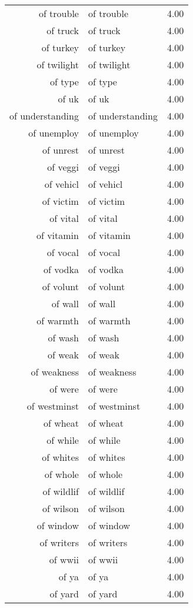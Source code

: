 \begin{table}[ht]
\begin{tabular}{rlr}
  of trouble & of trouble & 4.00 \\ 
  of truck & of truck & 4.00 \\ 
  of turkey & of turkey & 4.00 \\ 
  of twilight & of twilight & 4.00 \\ 
  of type & of type & 4.00 \\ 
  of uk & of uk & 4.00 \\ 
  of understanding & of understanding & 4.00 \\ 
  of unemploy & of unemploy & 4.00 \\ 
  of unrest & of unrest & 4.00 \\ 
  of veggi & of veggi & 4.00 \\ 
  of vehicl & of vehicl & 4.00 \\ 
  of victim & of victim & 4.00 \\ 
  of vital & of vital & 4.00 \\ 
  of vitamin & of vitamin & 4.00 \\ 
  of vocal & of vocal & 4.00 \\ 
  of vodka & of vodka & 4.00 \\ 
  of volunt & of volunt & 4.00 \\ 
  of wall & of wall & 4.00 \\ 
  of warmth & of warmth & 4.00 \\ 
  of wash & of wash & 4.00 \\ 
  of weak & of weak & 4.00 \\ 
  of weakness & of weakness & 4.00 \\ 
  of were & of were & 4.00 \\ 
  of westminst & of westminst & 4.00 \\ 
  of wheat & of wheat & 4.00 \\ 
  of while & of while & 4.00 \\ 
  of whites & of whites & 4.00 \\ 
  of whole & of whole & 4.00 \\ 
  of wildlif & of wildlif & 4.00 \\ 
  of wilson & of wilson & 4.00 \\ 
  of window & of window & 4.00 \\ 
  of writers & of writers & 4.00 \\ 
  of wwii & of wwii & 4.00 \\ 
  of ya & of ya & 4.00 \\ 
  of yard & of yard & 4.00 \\ 

\end{tabular}
\end{table}
